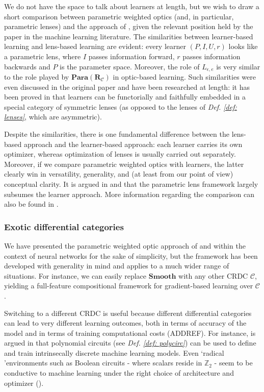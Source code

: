 \documentclass[12pt,a4paper,openright,twoside]{report}
\theoremstyle{plain}
\theoremstyle{definition}
\begin{document}
We do not have the space to talk about learners at length, but we wish to draw a short comparison between parametric weighted optics (and, in particular, parametric lenses) and the approach of \cite{fong2019backprop}, given the relevant position held by the paper in the machine learning literature. The similarities between learner-based learning and lens-based learning are evident: every learner $(P, I, U, r)$ looks like a parametric lens, where $I$ passes information forward, $r$ passes information backwards and $P$ is the parameter space. Moreover, the role of $L_{\epsilon, e}$ is very similar to the role played by $\mathbf{Para}(\mathbf{R}_{\mathcal{C}})$ in optic-based learning. Such similarities were even discussed in the original paper \cite{fong2019backprop} and have been researched at length: it has been proved in \cite{fong2019lenses} that learners can be functorially and faithfully embedded in a special category of symmetric lenses (as opposed to the lenses of \textit{Def. \ref{def: lenses}}, which are asymmetric).


Despite the similarities, there is one fundamental difference between the lens-based approach and the learner-based approach: each learner carries its own optimizer, whereas optimization of lenses is usually carried out separately. Moreover, if we compare parametric weighted optics with learners, the latter clearly win in versatility, generality, and (at least from our point of view) conceptual clarity. It is argued in \cite{shiebler2021category} and \cite{cruttwell2022categorical} that the parametric lens framework largely subsumes the learner approach. More information regarding the comparison can also be found in \cite{gavranovic2024fundamental}.


\subsubsection{Exotic differential categories}

We have presented the parametric weighted optic approach of \cite{gavranovic2024fundamental} and \cite{cruttwell2022categorical} within the context of neural networks for the sake of simplicity, but the framework has been developed with generality in mind and applies to a much wider range of situations. For instance, we can easily replace $\mathbf{Smooth}$ with any other CRDC $\mathcal{C}$, yielding a full-feature compositional framework for gradient-based learning over $\mathcal{C}$.


Switching to a different CRDC is useful because different differential categories can lead to very different learning outcomes, both in terms of accuracy of the model and in terms of training computational costs (ADDREF).
For instance, is argued in \cite{wilson2022categories} that polynomial circuits (see \textit{Def. \ref{def: polycirc}}) can be used to define and train intrinsecally discrete machine learning models. Even \lq radical \rq environments such as Boolean circuits - where scalars reside in $\mathbb{Z}_2$ - seem to be conductive to machine learning under the right choice of architecture and optimizer (\cite{wilson2021reverse}).
\end{document}

